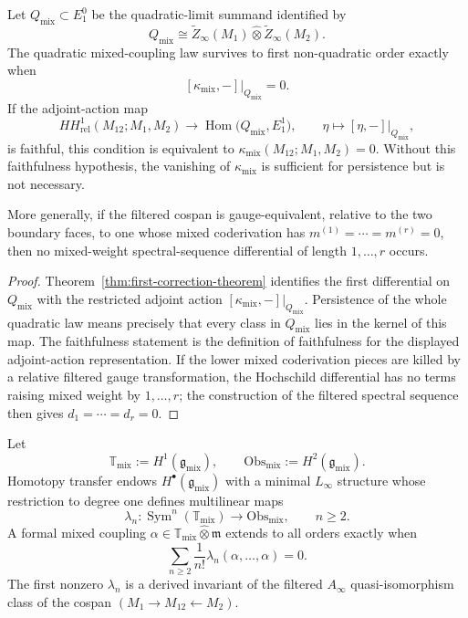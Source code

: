 \begin{corollary}
\label{cor:persistence-criterion-quadratic-law}
Let $Q_{\mathrm{mix}}\subset E_1^0$ be the quadratic-limit summand
identified by
\[
Q_{\mathrm{mix}}
\cong
\widetilde Z_\infty(M_1)\widehat\otimes \widetilde Z_\infty(M_2).
\]
The quadratic mixed-coupling law survives to first non-quadratic order
exactly when
\[
[\kappa_{\mathrm{mix}},-]\big|_{Q_{\mathrm{mix}}}=0.
\]
If the adjoint-action map
\[
HH^1_{\mathrm{rel}}(M_{12};M_1,M_2)
\longrightarrow
\operatorname{Hom}\bigl(Q_{\mathrm{mix}},E_1^1\bigr),
\qquad
\eta\longmapsto [\eta,-]\big|_{Q_{\mathrm{mix}}},
\]
is faithful, this condition is equivalent to
$\kappa_{\mathrm{mix}}(M_{12};M_1,M_2)=0$. Without this faithfulness
hypothesis, the vanishing of $\kappa_{\mathrm{mix}}$ is sufficient for
persistence but is not necessary.

More generally, if the filtered cospan is gauge-equivalent, relative to
the two boundary faces, to one whose mixed coderivation has
$m^{(1)}=\cdots=m^{(r)}=0$, then no mixed-weight spectral-sequence
differential of length $1,\dots,r$ occurs.
\end{corollary}

\begin{proof}
Theorem~\ref{thm:first-correction-theorem} identifies the first
differential on $Q_{\mathrm{mix}}$ with the restricted adjoint action
$[\kappa_{\mathrm{mix}},-]\big|_{Q_{\mathrm{mix}}}$. Persistence of the
whole quadratic law means precisely that every class in
$Q_{\mathrm{mix}}$ lies in the kernel of this map. The faithfulness
statement is the definition of faithfulness for the displayed
adjoint-action representation. If the lower mixed coderivation pieces
are killed by a relative filtered gauge transformation, the Hochschild
differential has no terms raising mixed weight by $1,\dots,r$; the
construction of the filtered spectral sequence then gives
$d_1=\cdots=d_r=0$.
\end{proof}

\begin{theorem}
\label{thm:universal-interaction-brackets}
Let
\[
\mathbb T_{\mathrm{mix}}:=H^1(\mathfrak g_{\mathrm{mix}}),
\qquad
\mathrm{Obs}_{\mathrm{mix}}:=H^2(\mathfrak g_{\mathrm{mix}}).
\]
Homotopy transfer endows $H^\bullet(\mathfrak g_{\mathrm{mix}})$ with a minimal $L_\infty$ structure whose restriction to degree one defines multilinear maps
\[
\lambda_n : \operatorname{Sym}^n(\mathbb T_{\mathrm{mix}}) \longrightarrow \mathrm{Obs}_{\mathrm{mix}},
\qquad n\ge 2.
\]
A formal mixed coupling $\alpha\in \mathbb T_{\mathrm{mix}}\widehat\otimes \mathfrak m$ extends to all orders exactly when
\[
\sum_{n\ge 2}\frac{1}{n!}\lambda_n(\alpha,\dots,\alpha)=0.
\]
The first nonzero $\lambda_n$ is a derived invariant of the filtered $A_\infty$ quasi-isomorphism class of the cospan $(M_1\to M_{12}\leftarrow M_2)$.
\end{theorem}

